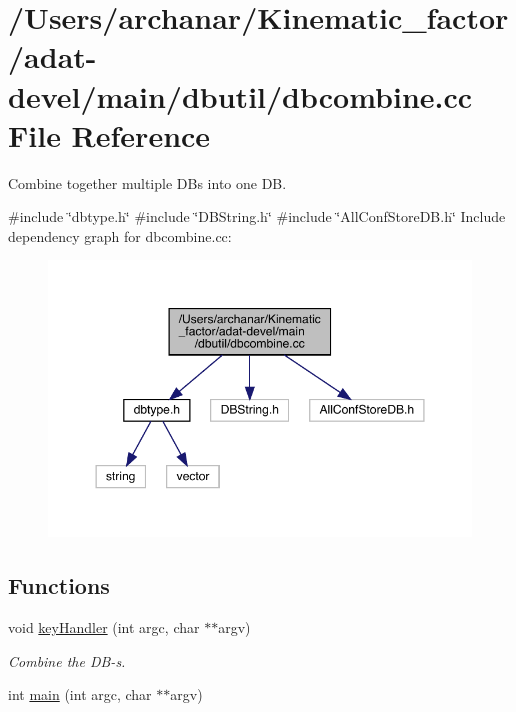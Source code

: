 \hypertarget{adat-devel_2main_2dbutil_2dbcombine_8cc}{}\section{/\+Users/archanar/\+Kinematic\+\_\+factor/adat-\/devel/main/dbutil/dbcombine.cc File Reference}
\label{adat-devel_2main_2dbutil_2dbcombine_8cc}


Combine together multiple DB\textquotesingle{}s into one DB.  


{\ttfamily \#include \char`\"{}dbtype.\+h\char`\"{}}\newline
{\ttfamily \#include \char`\"{}D\+B\+String.\+h\char`\"{}}\newline
{\ttfamily \#include \char`\"{}All\+Conf\+Store\+D\+B.\+h\char`\"{}}\newline
Include dependency graph for dbcombine.\+cc\+:
\nopagebreak
\begin{figure}[H]
\begin{center}
\leavevmode
\includegraphics[width=350pt]{d6/d70/adat-devel_2main_2dbutil_2dbcombine_8cc__incl}
\end{center}
\end{figure}
\subsection*{Functions}
\begin{DoxyCompactItemize}
\item 
void \mbox{\hyperlink{adat-devel_2main_2dbutil_2dbcombine_8cc_a4bb6e15c68dd2189289ab3095ab1ff5d}{key\+Handler}} (int argc, char $\ast$$\ast$argv)
\begin{DoxyCompactList}\small\item\em Combine the D\+B-\/s. \end{DoxyCompactList}\item 
int \mbox{\hyperlink{adat-devel_2main_2dbutil_2dbcombine_8cc_a3c04138a5bfe5d72780bb7e82a18e627}{main}} (int argc, char $\ast$$\ast$argv)
\end{DoxyCompactItemize}


